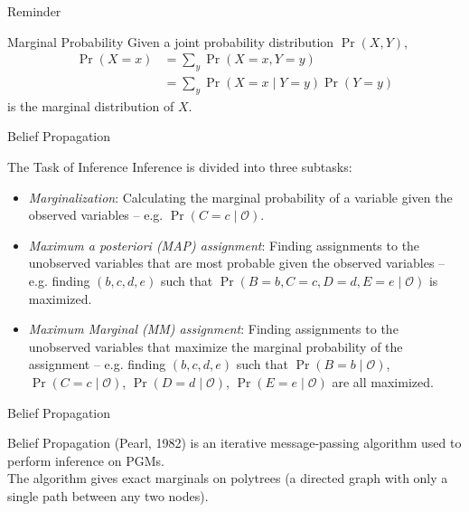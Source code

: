 \documentclass{beamer}
\begin{document}
\begin{frame}{Reminder}
    \pause
    \begin{block}{Marginal Probability}
        Given a joint probability distribution $ \Pr \left( X, Y \right) $,
        \begin{align*}
            \Pr \left( X = x \right) &= \sum_{y} \Pr \left( X = x, Y = y \right) \\
                                     &= \sum_{y} \Pr \left( X = x \mid Y = y \right) \Pr \left( Y = y \right)
        \end{align*}
        is the \alert{marginal distribution} of $ X $.
    \end{block}
\end{frame}
\begin{frame}{Belief Propagation}
    \begin{block}{The Task of Inference}
        Inference is divided into three subtasks:
        \pause
        \begin{itemize}[<+->]
            \item \emph{Marginalization}: Calculating the marginal probability of a variable given the observed variables -- e.g. $ \Pr \left( C = c \mid \mathcal{O} \right) $.
            \item \emph{Maximum a posteriori (MAP) assignment}: Finding assignments to the unobserved variables that are most probable given the observed variables -- e.g. finding $ \left( b, c, d, e \right) $ such that $ \Pr \left( B = b, C = c, D = d, E = e \mid \mathcal{O} \right) $ is maximized.
            \item \emph{Maximum Marginal (MM) assignment}: Finding assignments to the unobserved variables that maximize the marginal probability of the assignment -- e.g. finding $ \left( b, c, d, e \right) $ such that $ \Pr \left( B = b \mid \mathcal{O} \right) $,
            $ \Pr \left( C = c \mid \mathcal{O} \right) $, $ \Pr \left( D = d \mid \mathcal{O} \right) $, $ \Pr \left( E = e \mid \mathcal{O} \right) $ are all maximized.
        \end{itemize}
    \end{block}
\end{frame}
\begin{frame}{Belief Propagation}
    \begin{definition}
        Belief Propagation (Pearl, 1982) is an iterative message-passing algorithm used to perform inference on PGMs.\\
        The algorithm gives exact marginals on polytrees (a directed graph with only a single path between any two nodes).
    \end{definition}
\end{frame}
\end{document}
